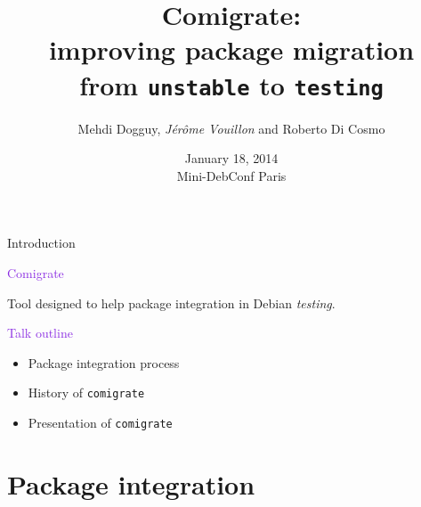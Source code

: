 \documentclass[xcolor={dvipsnames}]{beamer}
\title[Comigrate]%
{Comigrate: \\ improving package migration \\
 from \texttt{unstable} to \texttt{testing}}
\author[Di Cosmo/Dogguy/Vouillon]{Mehdi Dogguy, \emph{J\'er\^ome Vouillon} and Roberto Di Cosmo}
\date[2014-01-18]{January 18, 2014\\ Mini-DebConf Paris}
\newcommand{\EEE}[1]{\textcolor{BlueViolet}{#1}}
\begin{document}
\begin{frame}[label=title]{}
 \titlepage
 \vspace{-1.5cm}

\end{frame}

\begin{frame}{Introduction}

\EEE{Comigrate}

Tool designed to help package integration in Debian \textit{testing}.

\vspace{3em}

\EEE{Talk outline}
\begin{itemize}
\item Package integration process
\item History of \texttt{comigrate}
\item Presentation of \texttt{comigrate}
\end{itemize}
\end{frame}

\part{Package integration}
\frame{\partpage}
\end{document}
